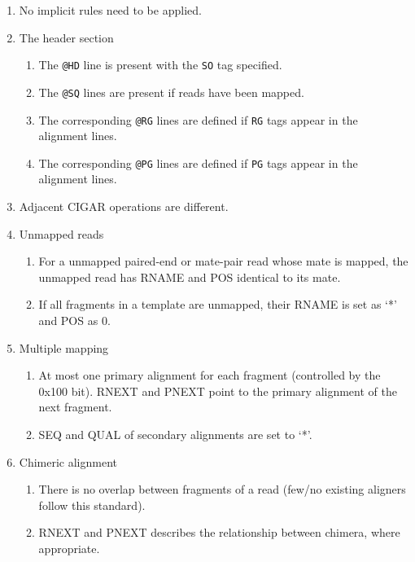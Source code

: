 \documentclass[10pt]{article}
\begin{document}
\begin{enumerate}
\item No implicit rules need to be applied.
\item The header section
  \begin{enumerate}[label*=\arabic*]
  \item The {\tt @HD} line is present with the {\tt SO} tag specified.
  \item The {\tt @SQ} lines are present if reads have been mapped.
  \item The corresponding {\tt @RG} lines are defined if {\tt RG} tags
    appear in the alignment lines.
  \item The corresponding {\tt @PG} lines are defined if {\tt PG} tags
    appear in the alignment lines.
  \end{enumerate}
\item Adjacent CIGAR operations are different.
\item Unmapped reads
  \begin{enumerate}[label*=\arabic*]
  \item For a unmapped paired-end or mate-pair read whose mate is
    mapped, the unmapped read has {\sf RNAME} and {\sf POS} identical to
    its mate.
  \item If all fragments in a template are unmapped, their {\sf RNAME}
    is set as `*' and {\sf POS} as 0.
  \end{enumerate}
\item Multiple mapping
  \begin{enumerate}[label*=\arabic*]
  \item At most one primary alignment for each fragment (controlled
    by the 0x100 bit). {\sf RNEXT} and {\sf PNEXT} point to the primary
    alignment of the next fragment.
  \item {\sf SEQ} and {\sf QUAL} of secondary alignments are set to `*'.
  \end{enumerate}
\item Chimeric alignment
  \begin{enumerate}[label*=\arabic*]
  \item There is no overlap between fragments of a read (few/no existing
    aligners follow this standard).
  \item {\sf RNEXT} and {\sf PNEXT} describes the relationship between
    chimera, where appropriate.
  \end{enumerate}  
\end{enumerate}
\end{document}
